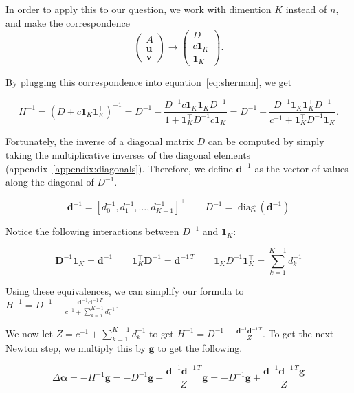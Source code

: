 \documentclass[twoside]{article}
\begin{document}
In order to apply this to our question, we work with dimention $K$ instead of $n$, and make the correspondence
\[
    \begin{pmatrix}
        A \\
        \boldsymbol{u} \\
        \boldsymbol{v}
    \end{pmatrix}
    \rightarrow
    \begin{pmatrix}
        D \\
        c \boldsymbol{1}_K \\
        \boldsymbol{1}_K
    \end{pmatrix}.
\]

By plugging this correspondence into equation~\ref{eq:sherman}, we get

\[
    H^{-1} = \left(D + c \boldsymbol{1}_K \boldsymbol{1}_K^\top\right)^{-1} = D^{-1} - \frac{D^{-1}c \boldsymbol{1}_K\boldsymbol{1}_K^{\top}D^{-1}}{1 + \boldsymbol{1}_K^{\top}D^{-1}c \boldsymbol{1}_K } = D^{-1} - \frac{D^{-1} \boldsymbol{1}_K\boldsymbol{1}_K^{\top}D^{-1}}{c^{-1} + \boldsymbol{1}_K^{\top}D^{-1} \boldsymbol{1}_K }.
\]

Fortunately, the inverse of a diagonal matrix $D$ can be computed by simply taking the multiplicative inverses of the diagonal elements (appendix~\ref{appendix:diagonals}). Therefore, we define $\boldsymbol{d}^{-1}$ as the vector of values along the diagonal of $D^{-1}$.

\[
    \boldsymbol{d}^{-1} = [d_0^{-1}, d_1^{-1}, \dots, d_{K-1}^{-1}]^\top\qquad D^{-1} = \operatorname{diag}(\boldsymbol{d}^{-1})
\]

Notice the following interactions between $D^{-1}$ and $\boldsymbol{1}_K$:
 
\[
\boldsymbol{D}^{-1}\boldsymbol{1}_K = \boldsymbol{d}^{-1} \qquad \boldsymbol{1}_K^\top\boldsymbol{D}^{-1} = \boldsymbol{d}^{-1\,T} \qquad \boldsymbol{1}_KD^{-1}\boldsymbol{1}_K^\top = \sum_{k=1}^{K-1} d_k^{-1}
\]

Using these equivalences, we can simplify our formula to \(H^{-1} = D^{-1} - \frac{\boldsymbol{d}^{-1} \boldsymbol{d}^{-1\,T}}{c^{-1} + \sum_{k=1}^{K-1} d_k^{-1}}.\)

We now let \(Z = c^{-1} + \sum_{k=1}^{K-1} d_k^{-1}\) to get \( H^{-1} = D^{-1} - \frac{\boldsymbol{d}^{-1} \boldsymbol{d}^{-1\,T}}{Z}.\) To get the next Newton step, we multiply this by \(\boldsymbol{g}\) to get the following.

\[
\Delta \boldsymbol{\alpha} = -H^{-1} \boldsymbol{g}= - D^{-1}\boldsymbol{g} + \frac{\boldsymbol{d}^{-1} \boldsymbol{d}^{-1\,T}}{Z}\boldsymbol{g} = - D^{-1} \boldsymbol{g} + \frac{\boldsymbol{d}^{-1} \boldsymbol{d}^{-1\,T}\boldsymbol{g}}{Z}
\]
\end{document}
